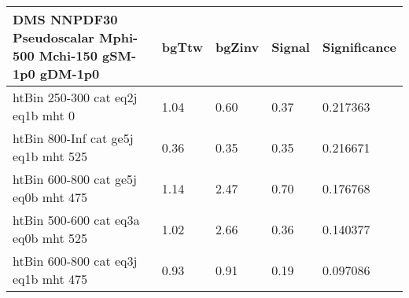 \begin{tabular}{|l|l|l|l|l|}
\small
  \label{mostSensitiveBins_DMS_NNPDF30_Pseudoscalar_Mphi-500_Mchi-150_gSM-1p0_gDM-1p0_25ns}
	\textbf{DMS NNPDF30 Pseudoscalar Mphi-500 Mchi-150 gSM-1p0 gDM-1p0}	 & 	bgTtw	 & 	bgZinv	 & 	Signal &	 Significance \\ 
	\hline
	htBin 250-300 cat eq2j eq1b mht 0 & 	1.04	 & 	0.60	 & 	0.37 	&0.217363 \\ 
	htBin 800-Inf cat ge5j eq1b mht 525 & 	0.36	 & 	0.35	 & 	0.35 	&0.216671 \\ 
	htBin 600-800 cat ge5j eq0b mht 475 & 	1.14	 & 	2.47	 & 	0.70 	&0.176768 \\ 
	htBin 500-600 cat eq3a eq0b mht 525 & 	1.02	 & 	2.66	 & 	0.36 	&0.140377 \\ 
	htBin 600-800 cat eq3j eq1b mht 475 & 	0.93	 & 	0.91	 & 	0.19 	&0.097086 \\ 
\end{tabular}
